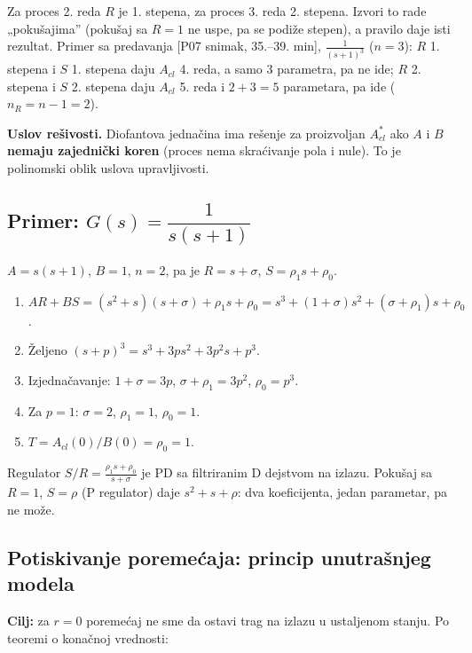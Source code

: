 \documentclass[11pt,a4paper,parskip=half,headsepline,numbers=noenddot]{scrartcl}
\DeclareRobustCommand{\izvor}[1]{{\small\color{izvorC}[#1]}}
\begin{document}
Za proces 2. reda \(R\) je 1. stepena, za proces 3. reda 2. stepena. Izvori to rade „pokušajima'' (pokušaj sa \(R = 1\) ne uspe, pa se podiže stepen), a pravilo daje isti rezultat. Primer sa predavanja \izvor{P07 snimak, 35.--39. min}, \(\frac{1}{(s+1)^3}\) (\(n = 3\)): \(R\) 1. stepena i \(S\) 1. stepena daju \(A_{cl}\) 4. reda, a samo 3 parametra, pa ne ide; \(R\) 2. stepena i \(S\) 2. stepena daju \(A_{cl}\) 5. reda i \(2 + 3 = 5\) parametara, pa ide (\(n_R = n - 1 = 2\)).

\textbf{Uslov rešivosti.} Diofantova jednačina ima rešenje za proizvoljan \(A_{cl}^*\) ako \(A\) i \(B\) \textbf{nemaju zajednički koren} (proces nema skraćivanje pola i nule). To je polinomski oblik uslova upravljivosti.

\subsection{\texorpdfstring{Primer: \(G(s) = \dfrac{1}{s(s+1)}\)}{Primer: G(s) = \textbackslash dfrac\{1\}\{s(s+1)\}}}

\(A = s(s+1)\), \(B = 1\), \(n = 2\), pa je \(R = s + \sigma\), \(S = \rho_1 s + \rho_0\).

\begin{enumerate}
\def\labelenumi{\arabic{enumi}.}
\item \(AR + BS = (s^2 + s)(s + \sigma) + \rho_1s + \rho_0 = s^3 + (1 + \sigma)s^2 + (\sigma + \rho_1)s + \rho_0\).
\item Željeno \((s + p)^3 = s^3 + 3ps^2 + 3p^2s + p^3\).
\item Izjednačavanje: \(1 + \sigma = 3p\), \(\sigma + \rho_1 = 3p^2\), \(\rho_0 = p^3\).
\item Za \(p = 1\): \(\sigma = 2\), \(\rho_1 = 1\), \(\rho_0 = 1\).
\item \(T = A_{cl}(0)/B(0) = \rho_0 = 1\).
\end{enumerate}

Regulator \(S/R = \frac{\rho_1s + \rho_0}{s + \sigma}\) je PD sa filtriranim D dejstvom na izlazu. Pokušaj sa \(R = 1\), \(S = \rho\) (P regulator) daje \(s^2 + s + \rho\): dva koeficijenta, jedan parametar, pa ne može.

\subsection{Potiskivanje poremećaja: princip unutrašnjeg modela}

\textbf{Cilj:} za \(r = 0\) poremećaj ne sme da ostavi trag na izlazu u ustaljenom stanju. Po teoremi o konačnoj vrednosti:
\end{document}
